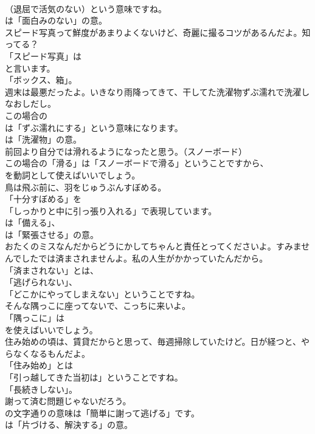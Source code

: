 \documentclass[8pt]{extreport}
\begin{document}
\begin{CJK}{UTF8}{min}
\\	（退屈で活気のない）という意味ですね。
\\	は「面白みのない」の意。	
\\	スピード写真って鮮度があまりよくないけど、奇麗に撮るコツがあるんだよ。知ってる？ 
\\	「スピード写真」は
\\	と言います。
\\	「ボックス、箱」。	
\\	週末は最悪だったよ。いきなり雨降ってきて、干してた洗濯物ずぶ濡れで洗濯しなおしだし。 
\\	この場合の 
\\	は「ずぶ濡れにする」という意味になります。
\\	は「洗濯物」の意。	
\\	前回より自分では滑れるようになったと思う。（スノーボード） 
\\	この場合の「滑る」は「スノーボードで滑る」ということですから、
\\	を動詞として使えばいいでしょう。	
\\	鳥は飛ぶ前に、羽をじゅうぶんすぼめる。 
\\	「十分すぼめる」を
\\	「しっかりと中に引っ張り入れる」で表現しています。
\\	は「備える」、
\\	は「緊張させる」の意。	
\\	おたくのミスなんだからどうにかしてちゃんと責任とってくださいよ。すみませんでしたでは済まされませんよ。私の人生がかかっていたんだから。 
\\	「済まされない」とは、
\\	「逃げられない」、
\\	「どこかにやってしまえない」ということですね。	
\\	そんな隅っこに座ってないで、こっちに来いよ。 
\\	「隅っこに」は
\\	を使えばいいでしょう。	
\\	住み始めの頃は、賃貸だからと思って、毎週掃除していたけど。日が経つと、やらなくなるもんだよ。 
\\	「住み始め」とは
\\	「引っ越してきた当初は」ということですね。
\\	「長続きしない」。	
\\	謝って済む問題じゃないだろう。 
\\	の文字通りの意味は「簡単に謝って逃げる」です。
\\	は「片づける、解決する」の意。	

\end{CJK}
\end{document}
